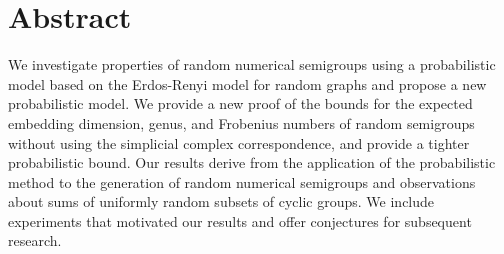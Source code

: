 \chapter*{Abstract}

We investigate properties of random numerical semigroups using a probabilistic model based on the Erdos-Renyi model for random graphs and propose a new probabilistic model. We provide a new proof of the bounds for the expected embedding dimension, genus, and Frobenius numbers of random semigroups without using the simplicial complex correspondence, and provide a tighter probabilistic bound. Our results derive from the application of the probabilistic method to the generation of random numerical semigroups and observations about sums of uniformly random subsets of cyclic groups. We include experiments that motivated our results and offer conjectures for subsequent research.